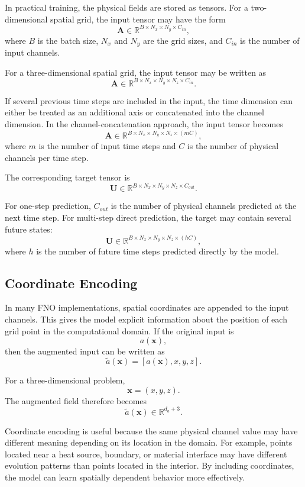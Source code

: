\documentclass[14pt]{extarticle}
\begin{document}
In practical training, the physical fields are stored as tensors. For a two-dimensional spatial grid, the input tensor may have the form
\[
\mathbf{A}
\in
\mathbb{R}^{B \times N_x \times N_y \times C_{in}},
\]
where \(B\) is the batch size, \(N_x\) and \(N_y\) are the grid sizes, and \(C_{in}\) is the number of input channels.

For a three-dimensional spatial grid, the input tensor may be written as
\[
\mathbf{A}
\in
\mathbb{R}^{B \times N_x \times N_y \times N_z \times C_{in}}.
\]

If several previous time steps are included in the input, the time dimension can either be treated as an additional axis or concatenated into the channel dimension. In the channel-concatenation approach, the input tensor becomes
\[
\mathbf{A}
\in
\mathbb{R}^{B \times N_x \times N_y \times N_z \times (mC)},
\]
where \(m\) is the number of input time steps and \(C\) is the number of physical channels per time step.

The corresponding target tensor is
\[
\mathbf{U}
\in
\mathbb{R}^{B \times N_x \times N_y \times N_z \times C_{out}}.
\]

For one-step prediction, \(C_{out}\) is the number of physical channels predicted at the next time step. For multi-step direct prediction, the target may contain several future states:
\[
\mathbf{U}
\in
\mathbb{R}^{B \times N_x \times N_y \times N_z \times (hC)},
\]
where \(h\) is the number of future time steps predicted directly by the model.

\subsection{Coordinate Encoding}

In many FNO implementations, spatial coordinates are appended to the input channels. This gives the model explicit information about the position of each grid point in the computational domain. If the original input is
\[
a(\mathbf{x}),
\]
then the augmented input can be written as
\[
\tilde{a}(\mathbf{x})
=
\left[
a(\mathbf{x}),
x,
y,
z
\right].
\]

For a three-dimensional problem,
\[
\mathbf{x}
=
(x,y,z).
\]
The augmented field therefore becomes
\[
\tilde{a}(\mathbf{x})
\in
\mathbb{R}^{d_a+3}.
\]

Coordinate encoding is useful because the same physical channel value may have different meaning depending on its location in the domain. For example, points located near a heat source, boundary, or material interface may have different evolution patterns than points located in the interior. By including coordinates, the model can learn spatially dependent behavior more effectively.
\end{document}
